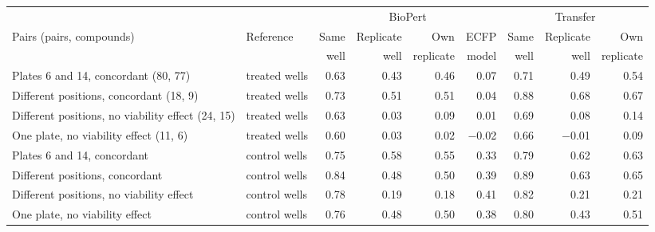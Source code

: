 \begin{table}[!htbp]
{\begin{minipage}{183mm}
\vspace{3mm}\setlength{\tabcolsep}{2.2pt}
\begin{tabular}{@{}>{\raggedright\arraybackslash}p{58mm}lrrrrrrr@{}}\toprule
 & & \multicolumn{4}{c}{BioPert} & \multicolumn{3}{c}{Transfer} \\ \cmidrule(lr){3-6}\cmidrule(lr){7-9}
Pairs (pairs, compounds) & Reference & Same & Replicate & Own & ECFP & Same & Replicate & Own \\
 & & well & well & replicate & model & well & well & replicate \\
\midrule
Plates 6 and 14, concordant (80, 77) & treated wells & 0.63 & 0.43 & 0.46 & 0.07 & 0.71 & 0.49 & 0.54 \\
Different positions, concordant (18, 9) & treated wells & 0.73 & 0.51 & 0.51 & 0.04 & 0.88 & 0.68 & 0.67 \\
Different positions, no viability effect (24, 15) & treated wells & 0.63 & 0.03 & 0.09 & 0.01 & 0.69 & 0.08 & 0.14 \\
One plate, no viability effect (11, 6) & treated wells & 0.60 & 0.03 & 0.02 & $-$0.02 & 0.66 & $-$0.01 & 0.09 \\
Plates 6 and 14, concordant & control wells & 0.75 & 0.58 & 0.55 & 0.33 & 0.79 & 0.62 & 0.63 \\
Different positions, concordant & control wells & 0.84 & 0.48 & 0.50 & 0.39 & 0.89 & 0.63 & 0.65 \\
Different positions, no viability effect & control wells & 0.78 & 0.19 & 0.18 & 0.41 & 0.82 & 0.21 & 0.21 \\
One plate, no viability effect & control wells & 0.76 & 0.48 & 0.50 & 0.38 & 0.80 & 0.43 & 0.51 \\
\bottomrule\end{tabular}
\end{minipage}}
\makebox[\textwidth][c]{\usebox{\tbox}}
\end{table}

